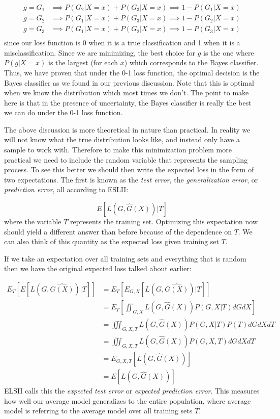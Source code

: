 \begin{equation}
\begin{split}
g=G_1 & \implies P(G_2|X=x) + P(G_3|X=x) \implies 1-P(G_1|X=x)\\
g=G_2 & \implies P(G_1|X=x) + P(G_3|X=x) \implies 1-P(G_2|X=x)\\
g=G_3 & \implies P(G_1|X=x) + P(G_2|X=x) \implies 1-P(G_3|X=x)\\
\end{split}
\end{equation}
since our loss function is 0 when it is a true classification and 1 when it is a misclassification. Since we are minimizing, the best choice for $g$ is the one where $P(g|X=x)$ is the largest (for each $x$) which corresponds to the Bayes classifier. Thus, we have proven that under the 0-1 loss function, the optimal decision is the Bayes classifier as we found in our previous discussion. Note that this is optimal when we know the distribution which most times we don't. The point to make here is that in the presence of uncertainty, the Bayes classifier is really the best we can do under the 0-1 loss function.

The above discussion is more theoretical in nature than practical. In reality we will not know what the true distribution looks like, and instead only have a sample to work with. Therefore to make this minimization problem more practical we need to include the random variable that represents the sampling process. To see this better we should then write the expected loss in the form of two expectations. The first is known as the \emph{test error}, the \emph{generalization error}, or \emph{prediction error}, all according to ESLII:

\begin{equation}
E[L(G, \hat{G}(X))|T]
\end{equation}
where the variable $T$ represents the training set.  Optimizing this expectation now should yield a different answer than before because of the dependence on $T$. We can also think of this quantity as the expected loss given training set $T$.

If we take an expectation over all training sets and everything that is random then we have the original expected loss talked about earlier:

\begin{equation}
\begin{split}
E_{T}[E[L(G, \hat{G(X)})|T]] &= E_{T}[E_{G,X}[L(G, \hat{G(X)})|T]] \\
&= E_{T}\left[\iint_{G, X} {L(G, \hat{G}(X)) P(G,X|T) dG dX}\right]\\
&= \iiint_{G, X, T} {L(G, \hat{G}(X)) P(G,X|T) P(T) dG dX dT} \\
&= \iiint_{G, X, T} {L(G, \hat{G}(X)) P(G,X,T) dG dX dT}\\
&= E_{G,X,T}[L(G, \hat{G}(X))]\\
&= E[L(G, \hat{G}(X))]
\end{split}
\end{equation}
ELSII calls this the \emph{expected test error} or \emph{expected prediction error}. This measures how well our average model generalizes to the entire population, where average model is referring to the average model over all training sets $T$. 

